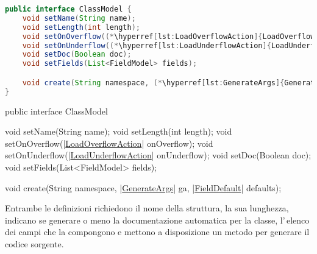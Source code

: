 \ifesource
\begin{figure*}[!htb]
\begin{lstlisting}[language=java, caption=interfaccia ClassModel, 
label=lst:ClassModel]
public interface ClassModel {
    void setName(String name);
    void setLength(int length);
    void setOnOverflow((*\hyperref[lst:LoadOverflowAction]{LoadOverflowAction}*) onOverflow);
    void setOnUnderflow((*\hyperref[lst:LoadUnderflowAction]{LoadUnderflowAction}*) onUnderflow);
    void setDoc(Boolean doc);
    void setFields(List<FieldModel> fields);

    void create(String namespace, (*\hyperref[lst:GenerateArgs]{GenerateArgs}*) ga, (*\hyperref[lst:FieldDefault]{FieldDefault}*) defaults);
}
\end{lstlisting}
\end{figure*}
\else
\begin{elisting}[!htb]
\begin{javacode}
public interface ClassModel {
    void setName(String name);
    void setLength(int length);
    void setOnOverflow(|\hyperref[lst:LoadOverflowAction]{LoadOverflowAction}| onOverflow);
    void setOnUnderflow(|\hyperref[lst:LoadUnderflowAction]{LoadUnderflowAction}| onUnderflow);
    void setDoc(Boolean doc);
    void setFields(List<FieldModel> fields);

    void create(String namespace, |\hyperref[lst:GenerateArgs]{GenerateArgs}| ga, |\hyperref[lst:FieldDefault]{FieldDefault}| defaults);
}
\end{javacode}
\caption{interfaccia ClassModel}
\label{lst:ClassModel}
\end{elisting}
\fi

Entrambe le definizioni richiedono il nome della struttura, la sua
lunghezza, indicano se generare o meno la documentazione automatica per la 
classe, l'\,elenco dei campi che la compongono e mettono a disposizione un 
metodo per generare il codice sorgente.

